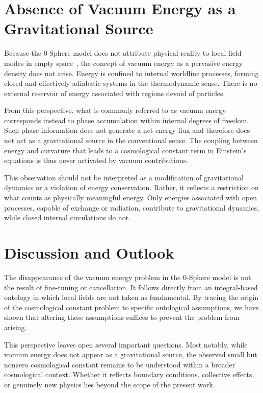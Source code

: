 \documentclass[%
 reprint,
 amsmath,amssymb,
 aps,
 prb,
]{revtex4-2}
\numberwithin{equation}{section}
\begin{document}
\section{Absence of Vacuum Energy as a Gravitational Source}
\label{sec:absence_vacuum}

Because the 0-Sphere model does not attribute physical reality to local field modes in empty space~\cite{Hanamura17765017}, the concept of vacuum energy as a pervasive energy density does not arise. Energy is confined to internal worldline processes, forming closed and effectively adiabatic systems in the thermodynamic sense. There is no external reservoir of energy associated with regions devoid of particles.

From this perspective, what is commonly referred to as vacuum energy corresponds instead to phase accumulation within internal degrees of freedom. Such phase information does not generate a net energy flux and therefore does not act as a gravitational source in the conventional sense. The coupling between energy and curvature that leads to a cosmological constant term in Einstein's equations is thus never activated by vacuum contributions.

This observation should not be interpreted as a modification of gravitational dynamics or a violation of energy conservation. Rather, it reflects a restriction on what counts as physically meaningful energy. Only energies associated with open processes, capable of exchange or radiation, contribute to gravitational dynamics, while closed internal circulations do not.

\clearpage

\section{Discussion and Outlook}
\label{sec:discussion}

The disappearance of the vacuum energy problem in the 0-Sphere model is not the result of fine-tuning or cancellation. It follows directly from an integral-based ontology in which local fields are not taken as fundamental. By tracing the origin of the cosmological constant problem to specific ontological assumptions, we have shown that altering these assumptions suffices to prevent the problem from arising.

This perspective leaves open several important questions. Most notably, while vacuum energy does not appear as a gravitational source, the observed small but nonzero cosmological constant remains to be understood within a broader cosmological context. Whether it reflects boundary conditions, collective effects, or genuinely new physics lies beyond the scope of the present work.
\end{document}
